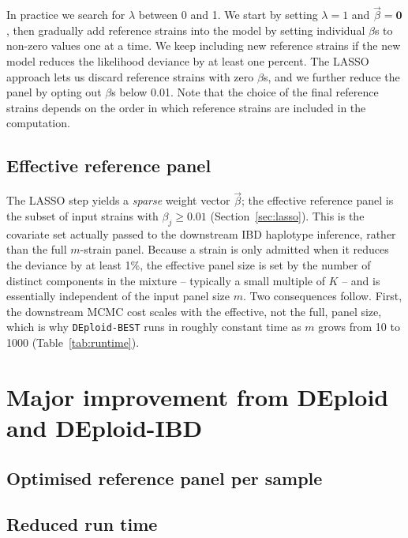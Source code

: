 \documentclass{article}
\renewcommand{\thepage}{S1-\arabic{page}}
\begin{document}
In practice we search for $\lambda$ between 0 and 1. We start by setting $\lambda = 1$ and $\overrightarrow{\beta} = \mathbf{0}$, then gradually add reference strains into the model by setting individual $\beta$s to non-zero values one at a time. We keep including new reference strains if the new model reduces the likelihood deviance by at least one percent. The LASSO approach lets us discard reference strains with zero $\beta$s, and we further reduce the panel by opting out $\beta$s below 0.01. Note that the choice of the final reference strains depends on the order in which reference strains are included in the computation.

\subsection{Effective reference panel}
\label{sec:effectpanel}

The LASSO step yields a \emph{sparse} weight vector $\overrightarrow{\beta}$; the
effective reference panel is the subset of input strains with $\beta_j \ge
0.01$ (Section~\ref{sec:lasso}). This is the covariate set actually passed to
the downstream IBD haplotype inference, rather than the full $m$-strain panel.
Because a strain is only admitted when it reduces the deviance by at least
1\%, the effective panel size is set by the number of distinct components in
the mixture -- typically a small multiple of $K$ -- and is essentially
independent of the input panel size $m$. Two consequences follow. First, the
downstream MCMC cost scales with the effective, not the full, panel size, which
is why {\tt DEploid-BEST} runs in roughly constant time as $m$ grows from 10 to
1000 (Table~\ref{tab:runtime}).


\newpage
\renewcommand{\thepage}{S3--\arabic{page}}

\setcounter{page}{1}

\section{Major improvement from DEploid and DEploid-IBD}
\subsection{Optimised reference panel per sample}



\subsection{Reduced run time}
\end{document}
